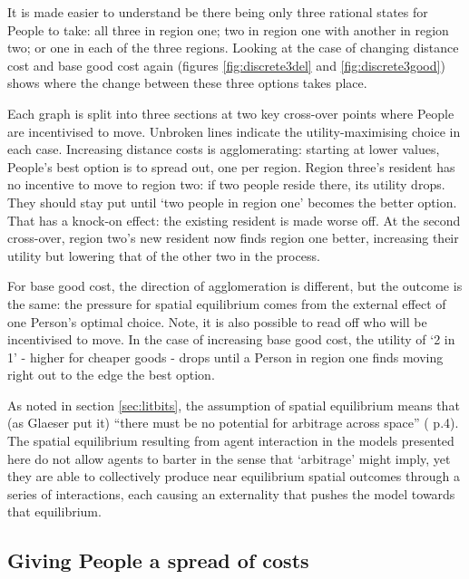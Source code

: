 It is made easier to understand be there being only three rational states for People to take: all three in region one; two in region one with another in region two; or one in each of the three regions. Looking at the case of changing distance cost and base good cost again (figures \ref{fig:discrete3del} and \ref{fig:discrete3good}) shows where the change between these three options takes place.

Each graph is split into three sections at two key cross-over points where People are incentivised to move. Unbroken lines indicate the utility-maximising choice in each case. Increasing distance costs is agglomerating: starting at lower values, People's best option is to spread out, one per region. Region three's resident has no incentive to move to region two: if two people reside there, its utility drops. They should stay put until `two people in region one' becomes the better option. That has a knock-on effect: the existing resident is made worse off. At the second cross-over, region two's new resident now finds region one better, increasing their utility but lowering that of the other two in the process.

For base good cost, the direction of agglomeration is different, but the outcome is the same: the pressure for spatial equilibrium comes from the external effect of one Person's optimal choice. Note, it is also possible to read off who will be incentivised to move. In the case of increasing base good cost, the utility of `2 in 1' - higher for cheaper goods - drops until a Person in region one finds moving right out to the edge the best option.

As noted in section \ref{sec:litbits}, the assumption of spatial equilibrium means that (as Glaeser put it) ``there must be no potential for arbitrage across space'' (\citealt{glaeser_cities_2008} p.4). The spatial equilibrium resulting from agent interaction in the models presented here do not allow agents to barter in the sense that `arbitrage' might imply, yet they are able to collectively produce near equilibrium spatial outcomes through a series of interactions, each causing an externality that pushes the model towards that equilibrium.


\subsection{Giving People a spread of costs \label{sec:vonThunen}}

